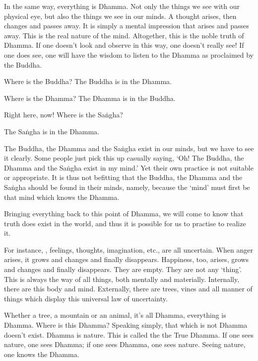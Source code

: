 In the same way, everything is Dhamma. Not only the things we see with our physical eye, but also the things we see in our minds. A thought arises, then changes and passes away. It is  simply a mental impression that arises and passes away. This is the real nature of the mind. Altogether, this is the noble truth of Dhamma. If one doesn't look and observe in this way, one doesn't really see! If one does see, one will have the wisdom to listen to the Dhamma as proclaimed by the Buddha.

Where is the Buddha? The Buddha is in the Dhamma.

Where is the Dhamma? The Dhamma is in the Buddha.

Right here, now! Where is the Sa\.ngha?

The Sa\.ngha is in the Dhamma.

The Buddha, the Dhamma and the Sa\.ngha exist in our minds, but we have to see it clearly. Some people just pick this up casually saying, `Oh! The Buddha, the Dhamma and the Sa\.ngha exist in my mind.' Yet their own practice is not suitable or appropriate. It is thus not befitting that the Buddha, the Dhamma and the Sa\.ngha should be found in their minds, namely, because the `mind' must first be that mind which knows the Dhamma. 

Bringing everything back to this point of Dhamma, we will come to know that truth does exist in the world, and thus it is possible for us to practise to realize it.

For instance, , feelings, thoughts, imagination, etc., are all uncertain. When anger arises, it grows and changes and finally disappears. Happiness, too, arises, grows and changes and finally disappears. They are empty. They are not any `thing'. This is always the way of all things, both mentally and materially. Internally, there are this body and mind. Externally, there are trees, vines and all manner of things which display this universal law of uncertainty. 

Whether a tree, a mountain or an animal, it's all Dhamma, everything is Dhamma. Where is this Dhamma? Speaking simply, that which is not Dhamma doesn't exist. Dhamma is nature. This is called the  the True Dhamma. If one sees nature, one sees Dhamma; if one sees Dhamma, one sees nature. Seeing nature, one knows the Dhamma. 

